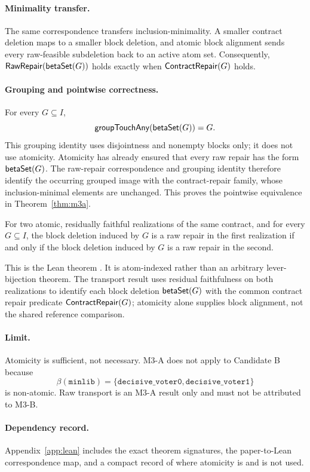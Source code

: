 \paragraph{Minimality transfer.}
The same correspondence transfers inclusion-minimality.  A smaller contract
deletion maps to a smaller block deletion, and atomic block alignment sends
every raw-feasible subdeletion back to an active atom set.  Consequently,
\(\mathsf{RawRepair}(\mathsf{betaSet}(G))\) holds exactly when
\(\mathsf{ContractRepair}(G)\) holds.

\paragraph{Grouping and pointwise correctness.}
For every \(G\subseteq I\),
\[
  \mathsf{groupTouchAny}(\mathsf{betaSet}(G))=G.
\]
This grouping identity uses disjointness and nonempty blocks only; it does not
use atomicity.  Atomicity has already ensured that every raw repair has the
form \(\mathsf{betaSet}(G)\).  The raw-repair correspondence and grouping identity
therefore identify the occurring grouped image with the contract-repair
family, whose inclusion-minimal elements are unchanged.  This proves the
pointwise equivalence in Theorem~\ref{thm:m3a}.

\begin{corollary}
\label{cor:m3a-raw}
For two atomic, residually faithful realizations of the same contract, and for
every \(G\subseteq I\), the block deletion induced by \(G\) is a raw repair in
the first realization if and only if the block deletion induced by \(G\) is a
raw repair in the second.
\end{corollary}

This is the Lean theorem .  It is atom-indexed rather
than an arbitrary lever-bijection theorem.
The transport result uses residual faithfulness on both realizations to
identify each block deletion \(\mathsf{betaSet}(G)\) with the common contract repair
predicate \(\mathsf{ContractRepair}(G)\); atomicity alone supplies block alignment,
not the shared reference comparison.

\paragraph{Limit.}
Atomicity is sufficient, not necessary.  M3-A does not apply to Candidate B
because
\[
  \beta(\mathtt{minlib})
  =
  \{\mathtt{decisive\_voter0},\mathtt{decisive\_voter1}\}
\]
is non-atomic.  Raw transport is an M3-A result only and must not be attributed
to M3-B.

\paragraph{Dependency record.}
Appendix~\ref{app:lean} includes the exact theorem signatures, the
paper-to-Lean correspondence map, and a compact record of where atomicity is
and is not used.
